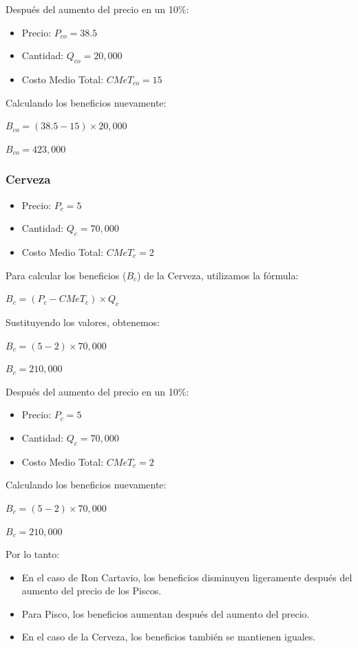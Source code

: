 \documentclass[
  a4paper,
]{article}
\providecommand{\tightlist}{%
  \setlength{\itemsep}{0pt}\setlength{\parskip}{0pt}}\usepackage{longtable,booktabs,array}
\theoremstyle{definition}
\theoremstyle{remark}
\begin{document}
Después del aumento del precio en un 10\%:

\begin{itemize}
\tightlist
\item
  Precio: \(P_{co} = 38.5\)
\item
  Cantidad: \(Q_{co} = 20,000\)
\item
  Costo Medio Total: \(CMeT_{co} = 15\)
\end{itemize}

Calculando los beneficios nuevamente:

\(B_{co} = (38.5 - 15) \times 20,000\)

\(B_{co} = 423,000\)

\hypertarget{cerveza}{%
\subsubsection{Cerveza}\label{cerveza}}

\begin{itemize}
\tightlist
\item
  Precio: \(P_c = 5\)
\item
  Cantidad: \(Q_c = 70,000\)
\item
  Costo Medio Total: \(CMeT_c = 2\)
\end{itemize}

Para calcular los beneficios (\(B_c\)) de la Cerveza, utilizamos la
fórmula:

\(B_c = (P_c - CMeT_c) \times Q_c\)

Sustituyendo los valores, obtenemos:

\(B_c = (5 - 2) \times 70,000\)

\(B_c = 210,000\)

Después del aumento del precio en un 10\%:

\begin{itemize}
\tightlist
\item
  Precio: \(P_c = 5\)
\item
  Cantidad: \(Q_c = 70,000\)
\item
  Costo Medio Total: \(CMeT_c = 2\)
\end{itemize}

Calculando los beneficios nuevamente:

\(B_c = (5 - 2) \times 70,000\)

\(B_c = 210,000\)

Por lo tanto:

\begin{itemize}
\tightlist
\item
  En el caso de Ron Cartavio, los beneficios disminuyen ligeramente
  después del aumento del precio de los Piscos.
\item
  Para Pisco, los beneficios aumentan después del aumento del precio.
\item
  En el caso de la Cerveza, los beneficios también se mantienen iguales.
\end{itemize}
\end{document}
